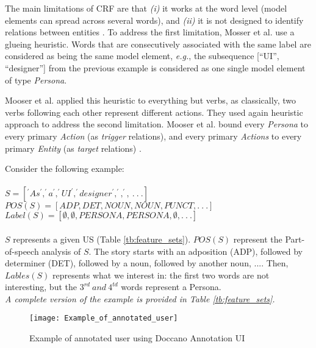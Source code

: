 The main limitations of CRF are that \emph{(i)} it works at the word level (model elements can spread across several words), and \emph{(ii)} it is not designed to identify relations between entities \cite{arulmohan2023extracting}.
    To address the first limitation, Mosser et al. use a glueing heuristic. Words that are consecutively associated with the same label are considered as being the same model element, \emph{e.g.}, the subsequence [\enquote{UI}, \enquote{designer}] from the previous example is considered as one single model element of type \emph{Persona}.
    
Mooser et al. applied this heuristic to everything but verbs, as classically, two verbs following each other represent different actions. They used again heuristic approach to address the second limitation. Mooser et al. bound every \emph{Persona} to every primary \emph{Action} (as\emph{ trigger} relations), and every primary \emph{Actions} to every primary \emph{Entity} (as \emph{target} relations) \cite{arulmohan2023extracting}.
\begin{example} Consider the following example:\\ \\
$S=[^\prime As^\prime,^\prime a^\prime,^\prime UI^\prime,^\prime designer^\prime,^\prime,^\prime,\ .\ .\ .]$ \\
$POS(S)=[ADP,DET,NOUN,NOUN,PUNCT,.\ .\ .]$ \\
$Label \left (S \right ) = \left [ \emptyset ,\emptyset ,PERSONA,PERSONA,\emptyset ,.\ .\ .\right ]$ \\\\
$S$ represents a given US (Table \ref{tb:feature_sets}). $POS \left (S \right )$ represent the Part-of-speech analysis of $S$. The story starts with an adposition (ADP), followed by determiner (DET), followed by a noun, followed by another noun, .... Then, $Lables\left (S \right )$ represents what we interest in: the first two words are not interesting, but the $3^{rd}\  and \ 4^{td}$ words represent a Persona.\\ 
\emph{A complete version of the example is provided in Table \ref{tb:feature_sets}.}
\end{example}
\begin{figure}
\center
\texttt{[image: Example\_of\_annotated\_user]}
\caption{Example of annotated user using Doccano Annotation UI \cite{arulmohan2023extracting}}\label{fig:annot_usr}
\end{figure}
